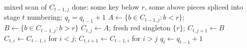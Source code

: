 \begin{myalgorithm}
\begin{algorithmic}[1]
\REQUIRE mixed scan of $C_{t-1,j}$ done: some key below $r$, some above
\ENSURE pieces spliced into stage $t$ numbering; $q_t = q_{t-1} + 1$
\STATE $A \gets \{b \in C_{t-1,j} : b < r\}$; $B \gets \{b \in C_{t-1,j} : b > r\}$
\STATE $C_{t,j} \gets A$; fresh red singleton $\{r\}$; $C_{t,j+1} \gets B$
\STATE $C_{t,i} \gets C_{t-1,i}$ for $i < j$; $C_{t,i+1} \gets C_{t-1,i}$ for $i > j$
\STATE $q_t \gets q_{t-1} + 1$
\end{algorithmic}
\end{myalgorithm}
